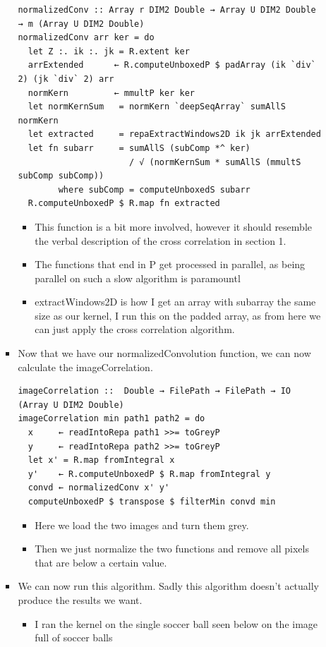 \documentclass{article}
\begin{document}
\begin{enumerate}
\begin{itemize}
\begin{itemize}
\begin{verbatim}
normalizedConv :: Array r DIM2 Double → Array U DIM2 Double → m (Array U DIM2 Double)
normalizedConv arr ker = do
  let Z :. ik :. jk = R.extent ker
  arrExtended      ← R.computeUnboxedP $ padArray (ik `div` 2) (jk `div` 2) arr
  normKern         ← mmultP ker ker
  let normKernSum   = normKern `deepSeqArray` sumAllS normKern
  let extracted     = repaExtractWindows2D ik jk arrExtended
  let fn subarr     = sumAllS (subComp *^ ker) 
                      / √ (normKernSum * sumAllS (mmultS subComp subComp))
        where subComp = computeUnboxedS subarr
  R.computeUnboxedP $ R.map fn extracted
\end{verbatim}
\begin{itemize}
\item This function is a bit more involved, however it should
resemble the verbal description of the cross correlation in
section 1.
\item The functions that end in P get processed in parallel, as being
parallel on such a slow algorithm is paramountl
\item extractWindows2D is how I get an array with subarray the same
size as our kernel, I run this on the padded array, as from here
we can just apply the cross correlation algorithm.
\end{itemize}
\item Now that we have our normalizedConvolution function, we can now
calculate the imageCorrelation.
\begin{verbatim}
imageCorrelation ::  Double → FilePath → FilePath → IO (Array U DIM2 Double)
imageCorrelation min path1 path2 = do
  x     ← readIntoRepa path1 >>= toGreyP
  y     ← readIntoRepa path2 >>= toGreyP
  let x' = R.map fromIntegral x
  y'    ← R.computeUnboxedP $ R.map fromIntegral y
  convd ← normalizedConv x' y'
  computeUnboxedP $ transpose $ filterMin convd min
\end{verbatim}
\begin{itemize}
\item Here we load the two images and turn them grey.
\item Then we just normalize the two functions and remove all pixels
that are below a certain value.
\end{itemize}
\item We can now run this algorithm. Sadly this algorithm doesn't
actually produce the results we want.
\begin{itemize}
\item I ran the kernel on the single soccer ball seen below on the
image full of soccer balls

\end{itemize}
\end{itemize}
\end{itemize}
\end{enumerate}
\end{document}
